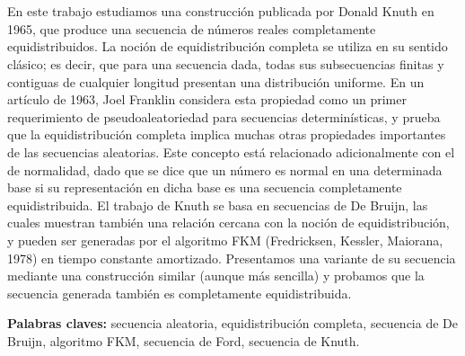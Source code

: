 \chapter*{\runtitulo}

\noindent En este trabajo estudiamos una construcción publicada por Donald Knuth en 1965, que produce una secuencia de números reales completamente equidistribuidos. La noción de equidistribución completa se utiliza en su sentido clásico; es decir, que para una secuencia dada, todas sus subsecuencias finitas y contiguas de cualquier longitud presentan una distribución uniforme. En un artículo de 1963, Joel Franklin considera esta propiedad como un primer requerimiento de pseudoaleatoriedad para secuencias determinísticas, y prueba que la equidistribución completa implica muchas otras propiedades importantes de las secuencias aleatorias. Este concepto está relacionado adicionalmente con el de normalidad, dado que se dice que un número es normal en una determinada base si su representación en dicha base es una secuencia completamente equidistribuida. El trabajo de Knuth se basa en secuencias de De Bruijn, las cuales muestran también una relación cercana con la noción de equidistribución, y pueden ser generadas por el algoritmo FKM (Fredricksen, Kessler, Maiorana, 1978) en tiempo constante amortizado. Presentamos una variante de su secuencia mediante una construcción similar (aunque más sencilla) y probamos que la secuencia generada también es completamente equidistribuida.

\bigskip

\noindent\textbf{Palabras claves:} secuencia aleatoria, equidistribución completa, secuencia de De Bruijn, algoritmo FKM, secuencia de Ford, secuencia de Knuth.